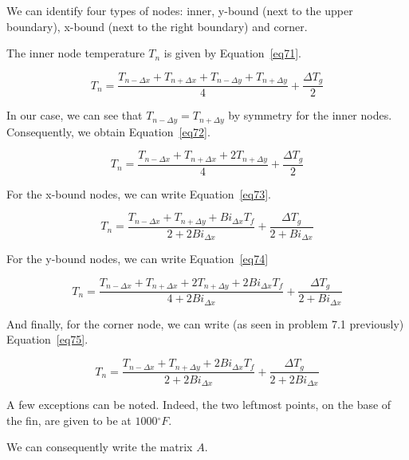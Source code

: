 We can identify four types of nodes: inner, y-bound (next to the upper boundary), x-bound (next to the right boundary) and corner.

The inner node temperature $T_n$ is given by Equation~\ref{eq71}.

\begin{equation}\label{eq71}
T_n = \frac{T_{n-\Delta x} + T_{n+\Delta x} + T_{n-\Delta y} + T_{n+\Delta y}}{4} + \frac{\Delta T_g}{2}
\end{equation}

In our case, we can see that $T_{n-\Delta y} = T_{n+\Delta y}$ by symmetry for the inner nodes. Consequently, we obtain Equation~\ref{eq72}.

\begin{equation}\label{eq72}
T_n = \frac{T_{n-\Delta x} + T_{n+\Delta x} + 2T_{n+\Delta y}}{4} + \frac{\Delta T_g}{2}
\end{equation}

For the x-bound nodes, we can write Equation~\ref{eq73}.


\begin{equation}\label{eq73}
T_n = \frac{T_{n-\Delta x} + T_{n+\Delta y} + Bi_{\Delta x}T_f}{2 + 2Bi_{\Delta x}} + \frac{\Delta T_g}{2+Bi_{\Delta x}}
\end{equation}

For the y-bound nodes, we can write Equation~\ref{eq74}

\begin{equation}\label{eq74}
T_n = \frac{T_{n-\Delta x} + T_{n+\Delta x} + 2T_{n+\Delta y} + 2Bi_{\Delta x}T_f}{4 + 2Bi_{\Delta x}} + \frac{\Delta T_g}{2+Bi_{\Delta x}}
\end{equation}

And finally, for the corner node, we can write (as seen in problem 7.1 previously) Equation~\ref{eq75}.

\begin{equation}\label{eq75}
T_n = \frac{T_{n-\Delta x} + T_{n+\Delta y} + 2Bi_{\Delta x}T_f}{2 + 2Bi_{\Delta x}} + \frac{\Delta T_g}{2+2Bi_{\Delta x}}
\end{equation}

A few exceptions can be noted. Indeed, the two leftmost points, on the base of the fin, are given to be at $1000{}^\circ F$.

We can consequently write the matrix $A$. 


